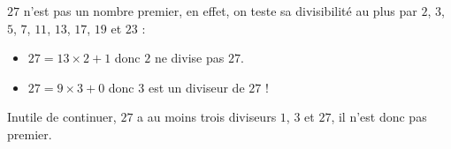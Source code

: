 \begin{exemple*1}
	$27$ n'est pas un nombre premier, en effet, on teste sa divisibilité au plus par $2$, $3$, $5$, $7$, $11$, $13$, $17$, $19$ et $23$ :
	\begin{itemize}
		\item $27=13\times 2+1$ donc $2$ ne divise pas $27$.
		\item $27=9\times 3+0$ donc 3 est un diviseur de $27$ !
	\end{itemize}
Inutile de continuer, $27$ a au moins trois diviseurs $1$, $3$ et $27$, il n'est donc pas premier.
\end{exemple*1}